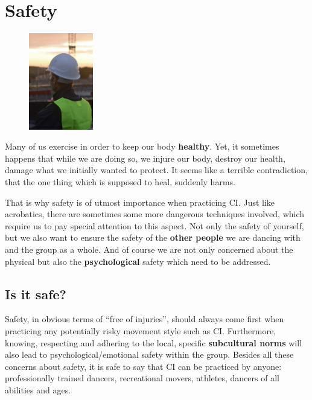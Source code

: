 \chapter{Safety}\label{ch:safety}

\begin{figure}
    \centering
    \includegraphics[width=0.25\textwidth]{images/safety}
\end{figure}

Many of us exercise in order to keep our body \textbf{healthy}.
Yet, it sometimes happens that while we are doing so, we injure our body, destroy our health, damage what we initially wanted to protect.
It seems like a terrible contradiction, that the one thing which is supposed to heal, suddenly harms.

That is why safety is of utmost importance when practicing CI\@.
Just like acrobatics, there are sometimes some more dangerous techniques involved, which require us to pay special attention to this aspect.
Not only the safety of yourself, but we also want to ensure the safety of the \textbf{other people} we are dancing with and the group as a whole.
And of course we are not only concerned about the physical but also the \textbf{psychological} safety which need to be addressed.

\section{Is it safe?}\label{sec:is-it-safe?}

Safety, in obvious terms of ``free of injuries'', should always come first when practicing any potentially risky movement style such as CI\@.
Furthermore, knowing, respecting and adhering to the local, specific \textbf{subcultural norms} will also lead to psychological/emotional safety within the group.
Besides all these concerns about safety, it is safe to say that CI can be practiced by anyone: professionally trained dancers, recreational movers, athletes, dancers of all abilities and ages.

